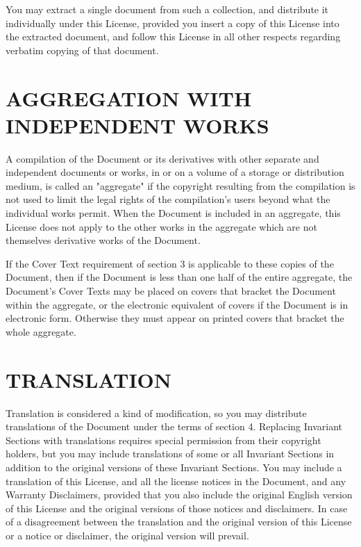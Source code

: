 \documentclass[oneside]{stacks-project-book}
\theoremstyle{plain}
\theoremstyle{definition}
\theoremstyle{remark}
\numberwithin{equation}{subsection}
\begin{document}
You may extract a single document from such a collection, and distribute
it individually under this License, provided you insert a copy of this
License into the extracted document, and follow this License in all
other respects regarding verbatim copying of that document.


\section{AGGREGATION WITH INDEPENDENT WORKS}
\label{fdl-section-aggregation-with-independent-works}
\hypertarget{05BM}{}
\reversemarginpar{}


A compilation of the Document or its derivatives with other separate
and independent documents or works, in or on a volume of a storage or
distribution medium, is called an "aggregate" if the copyright
resulting from the compilation is not used to limit the legal rights
of the compilation's users beyond what the individual works permit.
When the Document is included in an aggregate, this License does not
apply to the other works in the aggregate which are not themselves
derivative works of the Document.

If the Cover Text requirement of section 3 is applicable to these
copies of the Document, then if the Document is less than one half of
the entire aggregate, the Document's Cover Texts may be placed on
covers that bracket the Document within the aggregate, or the
electronic equivalent of covers if the Document is in electronic form.
Otherwise they must appear on printed covers that bracket the whole
aggregate.


\section{TRANSLATION}
\label{fdl-section-translation}
\hypertarget{05BN}{}
\reversemarginpar{}


Translation is considered a kind of modification, so you may
distribute translations of the Document under the terms of section 4.
Replacing Invariant Sections with translations requires special
permission from their copyright holders, but you may include
translations of some or all Invariant Sections in addition to the
original versions of these Invariant Sections.  You may include a
translation of this License, and all the license notices in the
Document, and any Warranty Disclaimers, provided that you also include
the original English version of this License and the original versions
of those notices and disclaimers.  In case of a disagreement between
the translation and the original version of this License or a notice
or disclaimer, the original version will prevail.
\end{document}
